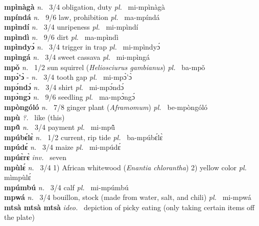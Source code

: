 {\bfseries mpìnàgà}  {\itshape n.~} 3/4 obligation, duty {\itshape pl.~} mi-mpìnàgà    \\ 
{\bfseries mpíndá}  {\itshape n.~} 9/6 law, prohibition {\itshape pl.~} ma-mpíndá    \\ 
{\bfseries mpìndí}  {\itshape n.~} 3/4 unripeness {\itshape pl.~} mi-mpìndí    \\ 
{\bfseries mpìndì}  {\itshape n.~} 9/6 dirt {\itshape pl.~} ma-mpìndì    \\ 
{\bfseries mpìndyɔ́}  {\itshape n.~} 3/4 trigger in trap {\itshape pl.~} mi-mpìndyɔ́    \\ 
{\bfseries mpìngá}  {\itshape n.~} 3/4 sweet cassava {\itshape pl.~} mi-mpìngá    \\ 
{\bfseries mpǒ}  {\itshape n.~} 1/2 sun squirrel ({\itshape Heliosciurus gambianus}) {\itshape pl.~} ba-mpǒ    \\ 
{\bfseries mpɔ̀'ɔ̀} - {\itshape n.~} 3/4 tooth gap {\itshape pl.~} mi-mpɔ̀'ɔ̀    \\ 
{\bfseries mpɔ́ndɔ́}  {\itshape n.~} 3/4 shirt {\itshape pl.~} mi-mpɔ́ndɔ́    \\ 
{\bfseries mpɔ̀ngɔ́}  {\itshape n.~} 9/6 seedling {\itshape pl.~} ma-mpɔ̀ngɔ́    \\ 
{\bfseries mpòngóló}  {\itshape n.~} 7/8 ginger plant ({\itshape Aframomum}) {\itshape pl.~} be-mpòngóló    \\ 
{\bfseries mpù}  {\itshape ?.~} like (this)    \\ 
{\bfseries mpũ̂}  {\itshape n.~} 3/4 payment {\itshape pl.~} mi-mpũ̂    \\ 
{\bfseries mpúbɛ́lɛ̀}  {\itshape n.~} 1/2 current, rip tide {\itshape pl.~} ba-mpúbɛ́lɛ̀    \\ 
{\bfseries mpúdɛ́}  {\itshape n.~} 3/4 maize {\itshape pl.~} mi-mpúdɛ́    \\ 
{\bfseries mpúɛ̀rɛ̀}  {\itshape inv.~} seven    \\ 
{\bfseries mpùlɛ́}  {\itshape n.~} 3/4 1) African whitewood ({\itshape Enantia chlorantha}) 2) yellow color {\itshape pl.~} mìmpùlɛ́    \\ 
{\bfseries mpúmbú}  {\itshape n.~} 3/4 calf {\itshape pl.~} mi-mpúmbú    \\ 
{\bfseries mpwá} {\itshape n.~} 3/4 bouillon, stock (made from water, salt, and chili) {\itshape pl.~} mi-mpwá    \\ 
{\bfseries mtsà mtsà mtsà}  {\itshape ideo.~} depiction of picky eating (only taking certain items off the plate)    \\ 
